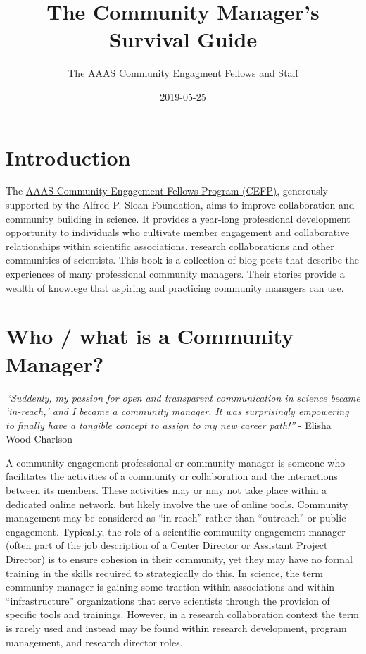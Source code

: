 \documentclass[]{book}
\title{The Community Manager's Survival Guide}
\author{The AAAS Community Engagment Fellows and Staff}
\date{2019-05-25}
\begin{document}
\maketitle

{
\setcounter{tocdepth}{1}
\tableofcontents
}
\hypertarget{introduction}{%
\chapter{Introduction}\label{introduction}}

The \href{https://www.aaas.org/programs/community-engagement-fellows}{AAAS Community Engagement Fellows Program (CEFP)}, generously supported by the Alfred P. Sloan Foundation, aims to improve collaboration and community building in science. It provides a year-long professional development opportunity to individuals who cultivate member engagement and collaborative relationships within scientific associations, research collaborations and other communities of scientists. This book is a collection of blog posts that describe the experiences of many professional community managers. Their stories provide a wealth of knowlege that aspiring and practicing community managers can use.

\hypertarget{who}{%
\chapter{Who / what is a Community Manager?}\label{who}}

\emph{``Suddenly, my passion for open and transparent communication in science became `in-reach,' and I became a community manager. It was surprisingly empowering to finally have a tangible concept to assign to my new career path!''} - Elisha Wood-Charlson

A community engagement professional or community manager is someone who facilitates the activities of a community or collaboration and the interactions between its members. These activities may or may not take place within a dedicated online network, but likely involve the use of online tools. Community management may be considered as ``in-reach'' rather than ``outreach'' or public engagement. Typically, the role of a scientific community engagement manager (often part of the job description of a Center Director or Assistant Project Director) is to ensure cohesion in their community, yet they may have no formal training in the skills required to strategically do this. In science, the term community manager is gaining some traction within associations and within ``infrastructure'' organizations that serve scientists through the provision of specific tools and trainings. However, in a research collaboration context the term is rarely used and instead may be found within research development, program management, and research director roles.
\end{document}
